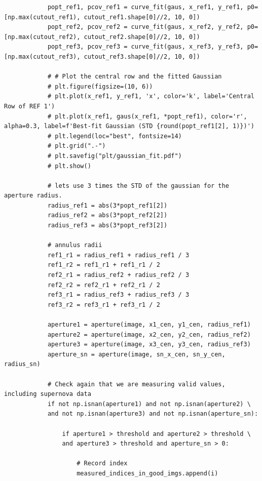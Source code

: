 \documentclass{article}
\begin{document}
\begin{appendices}
\begin{verbatim}
            popt_ref1, pcov_ref1 = curve_fit(gaus, x_ref1, y_ref1, p0=[np.max(cutout_ref1), cutout_ref1.shape[0]//2, 10, 0])
            popt_ref2, pcov_ref2 = curve_fit(gaus, x_ref2, y_ref2, p0=[np.max(cutout_ref2), cutout_ref2.shape[0]//2, 10, 0])
            popt_ref3, pcov_ref3 = curve_fit(gaus, x_ref3, y_ref3, p0=[np.max(cutout_ref3), cutout_ref3.shape[0]//2, 10, 0])
    
            # # Plot the central row and the fitted Gaussian
            # plt.figure(figsize=(10, 6))
            # plt.plot(x_ref1, y_ref1, 'x', color='k', label='Central Row of REF 1')
            # plt.plot(x_ref1, gaus(x_ref1, *popt_ref1), color='r', alpha=0.3, label=f'Best-fit Gaussian (STD {round(popt_ref1[2], 1)})')
            # plt.legend(loc="best", fontsize=14)
            # plt.grid(".-")
            # plt.savefig("plt/gaussian_fit.pdf")
            # plt.show()
            
            # lets use 3 times the STD of the gaussian for the aperture radius. 
            radius_ref1 = abs(3*popt_ref1[2])
            radius_ref2 = abs(3*popt_ref2[2])
            radius_ref3 = abs(3*popt_ref3[2])
    
            # annulus radii
            ref1_r1 = radius_ref1 + radius_ref1 / 3
            ref1_r2 = ref1_r1 + ref1_r1 / 2
            ref2_r1 = radius_ref2 + radius_ref2 / 3
            ref2_r2 = ref2_r1 + ref2_r1 / 2
            ref3_r1 = radius_ref3 + radius_ref3 / 3
            ref3_r2 = ref3_r1 + ref3_r1 / 2
    
            aperture1 = aperture(image, x1_cen, y1_cen, radius_ref1)
            aperture2 = aperture(image, x2_cen, y2_cen, radius_ref2)
            aperture3 = aperture(image, x3_cen, y3_cen, radius_ref3)
            aperture_sn = aperture(image, sn_x_cen, sn_y_cen, radius_sn)
            
            # Check again that we are measuring valid values, including supernova data
            if not np.isnan(aperture1) and not np.isnan(aperture2) \
            and not np.isnan(aperture3) and not np.isnan(aperture_sn):
    
                if aperture1 > threshold and aperture2 > threshold \
                and aperture3 > threshold and aperture_sn > 0:
                            
                    # Record index
                    measured_indices_in_good_imgs.append(i)
                    

\end{verbatim}
\end{appendices}
\end{document}
